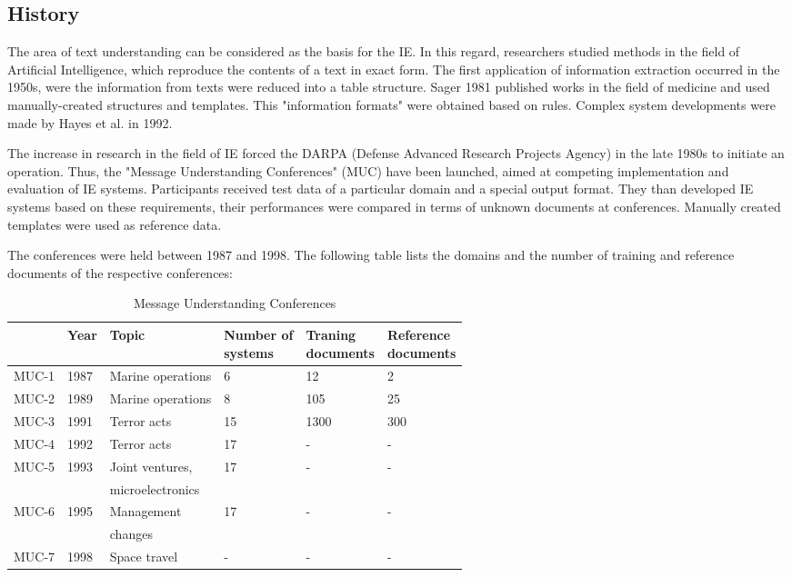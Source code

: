 \newpage
\subsection{History}
The area of text understanding can be considered as the basis for the \gls{IE}. In this regard, researchers studied methods in the field of Artificial Intelligence, which reproduce the contents of a text in exact form. The first application of information extraction occurred in the 1950s, were  the information from texts  were reduced into a table structure. Sager 1981 published works in the field of medicine and used manually-created structures and templates. This "information formats" were obtained based on rules. Complex system developments were made by Hayes et al. in 1992.

The increase in research in the field of IE forced the DARPA (Defense Advanced Research Projects Agency) in the late 1980s to initiate an operation. Thus, the "Message Understanding Conferences" (MUC) have been launched, aimed at competing implementation and evaluation of IE systems. Participants received test data of a particular domain and a special output format. They than developed IE systems based on these requirements, their performances were compared in terms of unknown documents at conferences. Manually created templates were used as reference data.

The conferences were held between 1987 and 1998. The following table lists the domains and the number of training and reference documents of the respective conferences:

\begin{table}[H]
\centering
\begin{tabular*}{\textwidth}{ l l l l l l }
	\toprule
	& Year & Topic & \shortstack{Number of \\ systems} & \shortstack{Traning \\ documents} & \shortstack{Reference \\ documents} \\
	\midrule
	MUC-1 & 1987 & Marine operations & 6 & 12 & 2 \\
	MUC-2 & 1989 & Marine operations & 8 & 105 & 25 \\
	MUC-3 & 1991 & Terror acts & 15 & 1300 & 300 \\
	MUC-4 & 1992 & Terror acts & 17 & - & - \\
	MUC-5 & 1993 & Joint ventures, & 17 & - & - \\
	& & microelectronics & & & \\
	MUC-6 & 1995 & Management & 17 & - & - \\
	& & changes & & & \\
	MUC-7 & 1998 & Space travel & - & - & - \\
	\bottomrule
\end{tabular*}
\caption{Message Understanding Conferences}
\end{table}

